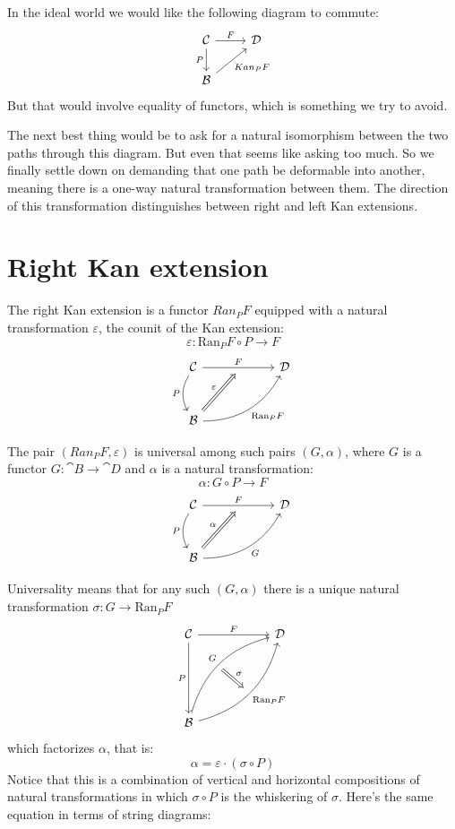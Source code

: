 \documentclass[DaoFP]{subfiles}
\begin{document}
In the ideal world we would like the following diagram to commute:
\[
 \begin{tikzcd} \cat C
 \arrow[r, "F"]
 \arrow[d, "P"']
 & \cat D
 \\
 \cat B
\arrow[ur, "Kan_P F"']
  \end{tikzcd}
\]
But that would involve equality of functors, which is something we try to avoid. 

The next best thing would be to ask for a natural isomorphism between the two paths through this diagram. But even that seems like asking too much. So we finally settle down on demanding that one path be deformable into another, meaning there is a one-way natural transformation between them. The direction of this transformation distinguishes between right and left Kan extensions.

\section{Right Kan extension}

The right Kan extension is a functor $Ran_P F$ equipped with a natural transformation $\varepsilon$, the counit of the Kan extension:
\[ \varepsilon \colon \text{Ran}_P F \circ P \to F\]
\[
 \begin{tikzcd} [row sep=1cm, column sep=1cm]
 \cat C
 \arrow[rr, "F", "" {name=ID, below} ]
 \arrow[d, bend right, "P"']
 && \cat D
 \\
 \cat B
  \arrow[urr, bend right, "\text{Ran}_P F"']
 \arrow[Rightarrow, "\varepsilon",  to=ID]
 \end{tikzcd}
\]

The pair $(Ran_P F, \varepsilon)$ is universal among such pairs $(G, \alpha)$, where $G$ is a functor $G \colon \cat B \to \cat D$ and $\alpha$ is a natural transformation:
\[ \alpha \colon G \circ P \to F \]
\[
 \begin{tikzcd} [row sep=1cm, column sep=1cm]
 \cat C
 \arrow[rr, "F", "" {name=ID, below} ]
 \arrow[d, bend right, "P"']
 && \cat D
 \\
 \cat B
  \arrow[urr, bend right, "G"']
 \arrow[Rightarrow, "\alpha",  to=ID]
 \end{tikzcd}
\]

Universality means that for any such $(G, \alpha)$ there is a unique natural transformation $\sigma \colon G \to \text{Ran}_P F$
\[
\begin{tikzcd}[row sep=2cm, column sep=2cm]
\cat C  \ar[d, "P"', "" {name=P}]
            \ar[r, "F", ""  {name=F, below, near start, bend right}]
&
\cat D
\\
\cat B
    \ar[ur, bend left, "G", "" {name=G, below}]
    \ar[ur, bend right, "\text{Ran}_P F"', "" {name=Ran}]
\arrow[Rightarrow, "\sigma", from=G, to=Ran]
\end{tikzcd}
\]
 which factorizes $\alpha$, that is:
\[ \alpha = \varepsilon \cdot (\sigma \circ P) \]
Notice that this is a combination of vertical and horizontal compositions of natural transformations in which $\sigma \circ P$ is the whiskering of $\sigma$. Here's the same equation in terms of string diagrams:
\end{document}
